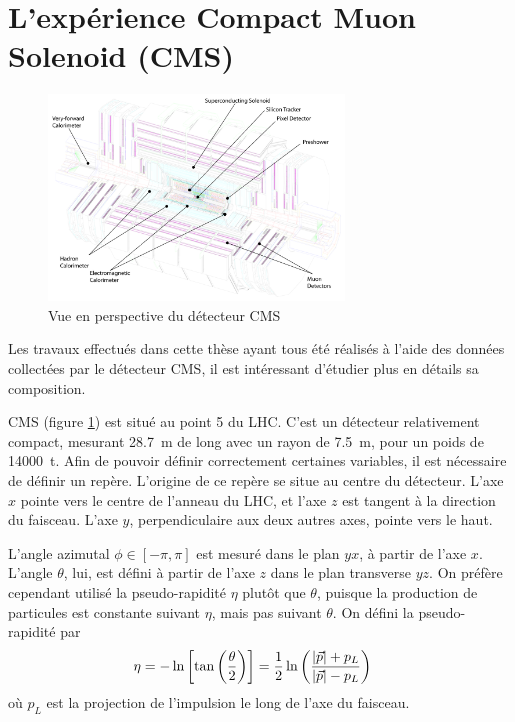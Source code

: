 % 

\section{L'expérience Compact Muon Solenoid (CMS)} \label{sec:cms}

\begin{figure} \centering
  \includegraphics[width=0.7\textwidth]{chapitre2/figs/CMS_2.pdf}
  \caption{Vue en perspective du détecteur CMS}
  \label{fig:cms}
\end{figure}

Les travaux effectués dans cette thèse ayant tous été réalisés à l'aide des données collectées par le détecteur CMS, il est intéressant d'étudier plus en détails sa composition.

\bigskip

CMS (figure \ref{fig:cms}) est situé au point 5 du LHC. C'est un détecteur relativement compact, mesurant \SI{28.7}{\m} de long avec un rayon de \SI{7.5}{\m}, pour un poids de \SI{14000}{\tonne}. Afin de pouvoir définir correctement certaines variables, il est nécessaire de définir un repère. L'origine de ce repère se situe au centre du détecteur. L'axe $x$ pointe vers le centre de l'anneau du LHC, et l'axe $z$ est tangent à la direction du faisceau. L'axe $y$, perpendiculaire aux deux autres axes, pointe vers le haut.

L'angle azimutal $\phi \in \left[-\pi, \pi\right]$ est mesuré dans le plan $yx$, à partir de l'axe $x$. L'angle $\theta$, lui, est défini à partir de l'axe $z$ dans le plan transverse $yz$. On préfère cependant utilisé la pseudo-rapidité $\eta$ plutôt que $\theta$, puisque la production de particules est constante suivant $\eta$, mais pas suivant $\theta$. On défini la pseudo-rapidité par
\begin{align*}
  \eta &= -\ln\left[\tan\left(\frac{\theta}{2}\right)\right] = \frac{1}{2} \ln\left(\frac{\lvert \vec{p} \rvert + p_L}{\lvert \vec{p} \rvert - p_L}\right)
\end{align*}
où $p_L$ est la projection de l'impulsion le long de l'axe du faisceau.

